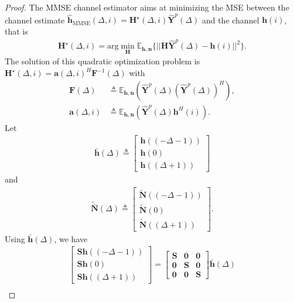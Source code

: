 \documentclass[conference, a4paper, 10pt]{IEEEtran}
\newcommand{\mx}[1]{\mathbf{#1}}
\begin{document}
\begin{proof}
The \ac{MMSE} channel estimator aims at minimizing the \ac{MSE} between the channel estimate
$\mathbf{\hat h}_{\textrm{MMSE}}(\Delta, i) = \mathbf{H}^\star(\Delta, i) \mathbf{\hat Y}^p(\Delta)$ and the channel $\mathbf{h}(i)$, that is
\begin{align}
\mathbf{H^\star}(\Delta, i)= \text{arg} \min_{\mathbf{H}} \mathds{E}_{\mathbf{h},\mathbf{n}}\{ ||\mathbf{H} \mathbf{\hat Y}^p(\Delta) - \mathbf{h}(i)||^2 \}.
\end{align}
The solution of this quadratic optimization problem is
$\mathbf{H^\star}(\Delta, i)= \mx{a}(\Delta, i)^H \mx{F}^{-1}(\Delta)$
with
\begin{align}
\label{eq:Fandb}
\mx{F}(\Delta) &\triangleq \mathds{E}_{\mathbf{h},\mathbf{n}}\left(\mx{\hat Y}^p(\Delta) \left(\mx{\hat Y}^p(\Delta)\right)^H\right), \\
\mx{a}(\Delta, i) &\triangleq \mathds{E}_{\mathbf{h},\mathbf{n}}\left( \mx{\hat Y}^p(\Delta) \mx{h}^{H}(i)\right).
\end{align}
Let
\begin{align}
\mx{\bar h}(\Delta) \triangleq \begin{bmatrix}
\mx{h}((-\Delta-1)) \\
\mx{h}(0) \\
\mx{h}((\Delta+1))
\end{bmatrix} \nonumber
\end{align}
and
\begin{align}
\mx{\tilde{\bar{N}}}(\Delta) \triangleq \begin{bmatrix}
\mx{\tilde{N}}((-\Delta-1)) \\
\mx{\tilde{N}}(0) \\
\mx{\tilde{N}}((\Delta+1))
\end{bmatrix}.
\end{align}
Using $\mx{\bar h}(\Delta)$, we have
\begin{align}
\begin{bmatrix}
\mx{S}\mx{h}((-\Delta-1)) \\
\mx{S}\mx{h}(0) \\
\mx{S}\mx{h}((\Delta+1))
\end{bmatrix}=
\begin{bmatrix}
\mx{S}  & \mx{0} & \mx{0} \\
\mx{0} & \mx{S}  & \mx{0} \\
\mx{0} & \mx{0} & \mx{S}
\end{bmatrix}\mx{\bar h}(\Delta)
\nonumber \\

\end{align}
\end{proof}
\end{document}
